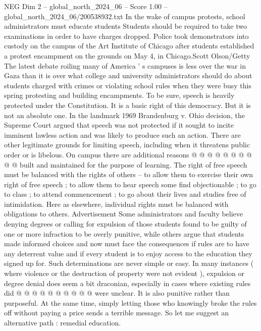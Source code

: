 \begin{textsample}{NEG Dim 2 – global\_north\_2024\_06 – Score 1.00 – global\_north\_2024\_06/200538932.txt}  \label{ex:f2_neg_126}
In the wake of campus protests, school administrators must educate students Students should be required to take two examinations in order to have charges dropped.
Police took demonstrators into custody on the campus of the Art Institute of Chicago after students established a protest encampment on the grounds on May 4, in Chicago.Scott Olson/Getty The latest debate roiling many of America ' s campuses is less over the war in Gaza than it is over what college and university administrators should do about students charged with crimes or violating school rules when they were busy this spring protesting and building encampments.
To be sure, speech is heavily protected under the Constitution.
It is a basic right of this democracy.
But it is not an absolute one.
In the landmark 1969 Brandenburg v.
Ohio decision, the Supreme Court argued that speech was not protected if it sought to incite imminent lawless action and was likely to produce such an action.
There are other legitimate grounds for limiting speech, including when it threatens public order or is libelous.
On campus there are additional reasons @ @ @ @ @ @ @ @ @ @ built and maintained for the purpose of learning.
The right of free speech must be balanced with the rights of others -- to allow them to exercise their own right of free speech ; to allow them to hear speech some find objectionable ; to go to class ; to attend commencement ; to go about their lives and studies free of intimidation.
Here as elsewhere, individual rights must be balanced with obligations to others.
Advertisement Some administrators and faculty believe denying degrees or calling for expulsion of those students found to be guilty of one or more infraction to be overly punitive, while others argue that students made informed choices and now must face the consequences if rules are to have any deterrent value and if every student is to enjoy access to the education they signed up for.
Such determinations are never simple or easy.
In many instances ( where violence or the destruction of property were not evident ), expulsion or degree denial does seem a bit draconian, especially in cases where existing rules did @ @ @ @ @ @ @ @ @ @ were unclear.
It is also punitive rather than purposeful.
At the same time, simply letting those who knowingly broke the rules off without paying a price sends a terrible message.
So let me suggest an alternative path : remedial education.

\end{textsample}

